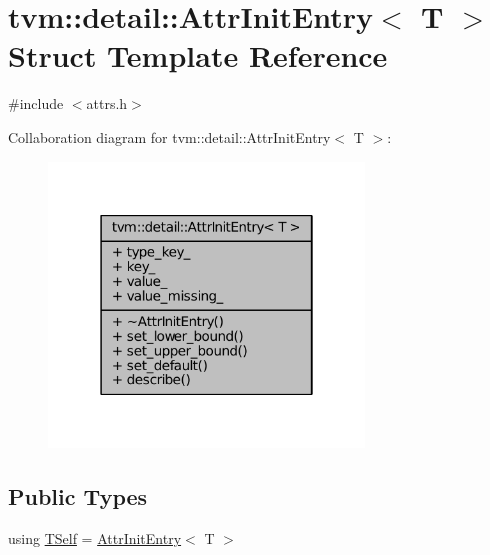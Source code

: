 \hypertarget{structtvm_1_1detail_1_1AttrInitEntry}{}\section{tvm\+:\+:detail\+:\+:Attr\+Init\+Entry$<$ T $>$ Struct Template Reference}
\label{structtvm_1_1detail_1_1AttrInitEntry}


{\ttfamily \#include $<$attrs.\+h$>$}



Collaboration diagram for tvm\+:\+:detail\+:\+:Attr\+Init\+Entry$<$ T $>$\+:
\nopagebreak
\begin{figure}[H]
\begin{center}
\leavevmode
\includegraphics[width=238pt]{structtvm_1_1detail_1_1AttrInitEntry__coll__graph}
\end{center}
\end{figure}
\subsection*{Public Types}
\begin{DoxyCompactItemize}
\item 
using \hyperlink{structtvm_1_1detail_1_1AttrInitEntry_acac846c239440c570206f36c2d04c373}{T\+Self} = \hyperlink{structtvm_1_1detail_1_1AttrInitEntry}{Attr\+Init\+Entry}$<$ T $>$
\end{DoxyCompactItemize}
